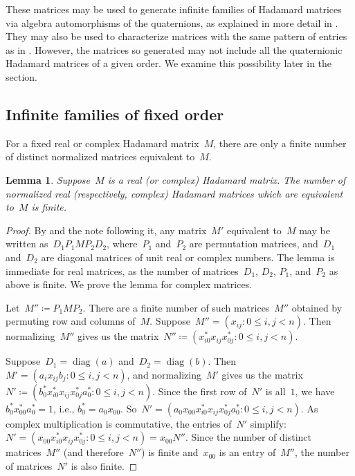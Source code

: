\documentclass[12pt]{article}
\numberwithin{equation}{section}
\newtheorem{lemma}[theorem]{Lemma}
\newcommand{\eqdef}{\coloneqq}
\DeclareMathOperator{\diag}{diag}
\begin{document}
These matrices may be used to generate infinite families of Hadamard matrices via algebra automorphisms of the quaternions, as explained in more detail in .
They may also be used to characterize matrices with the same pattern of entries as in .
However, the matrices so generated may not include all the quaternionic Hadamard matrices of a given order.
We examine this possibility later in the section.

\subsection{Infinite families of fixed order}
\label{sec-inf-families}

For a fixed real or complex Hadamard matrix~$M$, there are only a finite number of distinct normalized matrices equivalent to~$M$. 
\begin{lemma}
\label{lem-finite-equiv-class}
Suppose~$M$ is a real (or complex) Hadamard matrix. The number of normalized real (respectively, complex) Hadamard matrices which are equivalent to~$M$ is finite.
\end{lemma}
\begin{proof}
By  and the note following it, any matrix~$M'$ equivalent to~$M$ may be written as~$D_1 P_1 M P_2 D_2$, where~$P_1$ and~$P_2$ are permutation matrices, and~$D_1$ and~$D_2$ are diagonal matrices of unit real or complex numbers. The lemma is immediate for real matrices, as the number of matrices~$D_1$, $D_2$, $P_1$, and~$P_2$ as above is finite. We prove the lemma for complex matrices. 

Let~$M'' \eqdef P_1 M P_2$. There are a finite number of such matrices~$M''$ obtained by permuting row and columns of~$M$. Suppose~$M'' = (x_{ij} : 0 \le i,j < n)$. Then normalizing~$M''$ gives us the matrix~$N'' \eqdef ( x_{i0}^* x_{ij} x_{0j}^* : 0 \le i,j < n)$.

Suppose~$D_1 = \diag(a)$ and~$D_2 = \diag(b)$. Then~$M' = ( a_i x_{ij} b_j : 0 \le i,j < n)$, and normalizing~$M'$ gives us the matrix~$N' \eqdef ( b_0^* x_{i0}^* x_{ij} x_{0j}^* a_0^* : 0 \le i,j < n )$. Since the first row of~$N'$ is all~$1$, we have~$ b_0^* x_{00}^* a_0^* = 1$, i.e., $b_0^* = a_0 x_{00}$. So~$N' = ( a_0 x_{00} x_{i0}^* x_{ij} x_{0j}^* a_0^* : 0 \le i,j < n )$. As complex multiplication is commutative, the entries of~$N'$ simplify:~$ N' = ( x_{00} x_{i0}^* x_{ij} x_{0j}^* : 0 \le i,j < n ) = x_{00} N''$. Since the number of distinct matrices~$M''$ (and therefore~$N''$) is finite and~$x_{00}$ is an entry of~$M''$, the number of matrices~$N'$ is also finite.
\end{proof}
\end{document}
